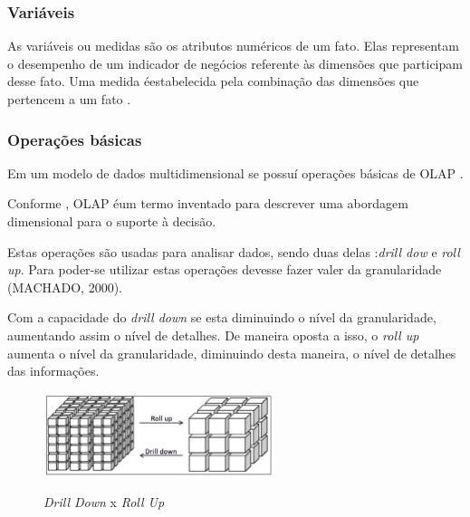 \subsubsection{Vari\'{a}veis}

As vari\'{a}veis ou medidas s\~{a}o os atributos num\'{e}ricos de um fato. Elas representam o desempenho de um indicador de neg\'{o}cios referente \`{a}s dimens\~{o}es que participam desse fato. Uma medida \'{e}estabelecida pela combina\c{c}\~{a}o das dimens\~{o}es que pertencem a um fato \cite{bi-machado-2018}.

\subsubsection{Opera\c{c}\~{o}es b\'{a}sicas}

Em um modelo de dados multidimensional se possu\'{i} opera\c{c}\~{o}es b\'{a}sicas de 
OLAP .

Conforme \cite{dw-kimball-1998}, OLAP \'{e}um termo inventado para descrever uma abordagem dimensional para o suporte \`{a} decis\~{a}o.

Estas opera\c{c}\~{o}es s\~{a}o usadas para analisar dados, sendo duas delas
:\textit{drill dow} e \textit{roll up}. Para poder-se utilizar estas opera\c{c}\~{o}es devesse fazer valer da granularidade (MACHADO, 2000).

Com a capacidade do \textit{drill down} se esta diminuindo o n\'{i}vel da granularidade, aumentando assim o n\'{i}vel de detalhes. De maneira oposta a isso, 
o \textit{roll up} aumenta o n\'{i}vel da granularidade, diminuindo desta maneira, o n\'{i}vel de detalhes das informa\c{c}\~{o}es.

\begin{figure}[H]
	\vspace*{0,2cm}
    \centering
    \caption{\textit{Drill Down} x  \textit{Roll Up}}
    \includegraphics[width=0.6\textwidth]{./04-figuras/figura-08}
    \label{fig:ilustfig08}
\end{figure}
\vspace*{-0,9cm}
{\raggedright {}}\\

